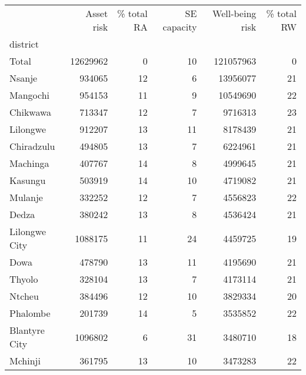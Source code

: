 \begin{tabular}{lrrrrr}
\toprule
{} &  Asset risk &  \% total RA &  SE capacity &  Well-being risk &  \% total RW \\
district      &             &             &              &                  &             \\
\midrule
Total         &    12629962 &           0 &           10 &        121057963 &           0 \\
Nsanje        &      934065 &          12 &            6 &         13956077 &          21 \\
Mangochi      &      954153 &          11 &            9 &         10549690 &          22 \\
Chikwawa      &      713347 &          12 &            7 &          9716313 &          23 \\
Lilongwe      &      912207 &          13 &           11 &          8178439 &          21 \\
Chiradzulu    &      494805 &          13 &            7 &          6224961 &          21 \\
Machinga      &      407767 &          14 &            8 &          4999645 &          21 \\
Kasungu       &      503919 &          14 &           10 &          4719082 &          21 \\
Mulanje       &      332252 &          12 &            7 &          4556823 &          22 \\
Dedza         &      380242 &          13 &            8 &          4536424 &          21 \\
Lilongwe City &     1088175 &          11 &           24 &          4459725 &          19 \\
Dowa          &      478790 &          13 &           11 &          4195690 &          21 \\
Thyolo        &      328104 &          13 &            7 &          4173114 &          21 \\
Ntcheu        &      384496 &          12 &           10 &          3829334 &          20 \\
Phalombe      &      201739 &          14 &            5 &          3535852 &          22 \\
Blantyre City &     1096802 &           6 &           31 &          3480710 &          18 \\
Mchinji       &      361795 &          13 &           10 &          3473283 &          22 \\

\end{tabular}
